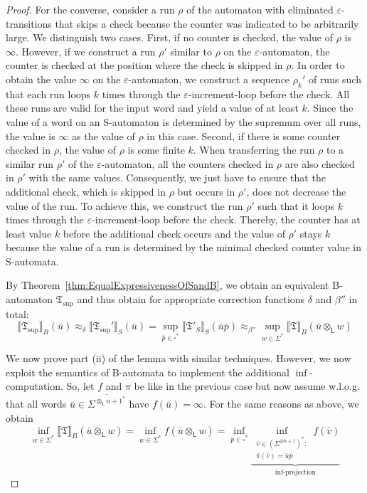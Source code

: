 \documentclass{LMCS}
\newcommand{\eps}{\varepsilon}
\newcommand{\pad}{\square}
\newcommand{\automatonT}{\mathfrak T}
\newcommand{\semantics}[1]{\llbracket#1\rrbracket}
\newcommand{\costEquiv}[1][\alpha]{\approx_{#1}}
\newcommand{\padprodL}{\otimes_{\mathsf{L}}}
\newcommand{\alphVectorS}[2]{\left(#1^{\otimes #2}\right)^*}
\newcommand{\NalphVectorL}[2]{\overline{#1^{{\padprodL #2}^*}}}
\newcommand{\twosm}[2]{\begin{smallmatrix} #1 \\ #2 \end{smallmatrix}}
\begin{document}
\begin{proof}
For the converse, consider a run $\rho$ of the automaton with eliminated 
$\eps$-transitions that skips a check because the counter was indicated to be 
arbitrarily large. We distinguish two cases. First, if no counter is checked,
the value of $\rho$ is $\infty$. However, if we construct
a run $\rho'$ similar to $\rho$ on the $\eps$-automaton, the counter is checked
at the position where the check is skipped in $\rho$. In order to obtain the
value $\infty$ on the $\eps$-automaton, we construct a sequence $\rho_k'$ of
runs such that each run loops $k$ 
times through the $\eps$-increment-loop before the check. All these runs are valid
for the input word and yield a value of at least $k$. Since the value of a word on an
S-automaton is determined by the supremum over all runs, the value is $\infty$
as the value of $\rho$ in this case. Second, if there is some counter checked
in $\rho$, the value of $\rho$ is some finite $k$. When transferring the run
$\rho$ to a similar run $\rho'$ of the $\eps$-automaton, all the counters 
checked in $\rho$ are also checked in $\rho'$ with the same values. 
Consequently, we just have to ensure that the
additional check, which is skipped in $\rho$ but occurs in $\rho'$,
does not decrease the value of the run. To achieve this, we construct the run
$\rho'$ such that it loops $k$ times through the $\eps$-increment-loop before 
the check. Thereby, the counter has at least value $k$ before
the additional check occurs and the value of $\rho'$ stays $k$ because the
value of a run is determined by the minimal checked counter value in S-automata.

By Theorem~\ref{thm:EqualExpressivenessOfSandB}, we obtain an equivalent
B-automaton $\automatonT_{\sup}$ and thus obtain for appropriate correction 
functions $\delta$ and $\beta''$ in total:
\[
 \semantics{\automatonT_{\sup}}_B(\bar u) \costEquiv[\delta]
 \semantics{\automatonT_{\sup}'}_S(\bar u) = \sup\limits_{\bar p \in \pad^*}
 \semantics{\automatonT'_S}_S(\bar u \bar p) \costEquiv[\beta''] \sup_{w \in
 \Sigma^*} \semantics{\automatonT}_B(\bar u \padprodL w) 
\]
 
We now prove part (ii) of the lemma with similar techniques. However, we now
exploit the semantics of B-automata to implement the additional
$\inf$-computation.  So, let $f$ and $\pi$ be like in the previous case but now
assume w.l.o.g. that all words $\bar u \in \NalphVectorL{\Sigma}{n+1}$ have
$f(\bar u) = \infty$. For the same reasons as above, we obtain
\[ 
  \inf_{w \in \Sigma^*} \semantics{\automatonT}_B(\bar u \padprodL w) =
  \inf_{w \in \Sigma^*} f(\bar u \padprodL w) =  \inf_{\bar p \in \pad^*}
   \underbrace{\inf_{\twosm{\bar v \in \alphVectorS{\Sigma}{n+1}:}{\bar\pi(\bar v) =
   \bar u \bar p}} f(\bar v)}_{\inf\text{-projection}}
\]


\end{proof}
\end{document}
